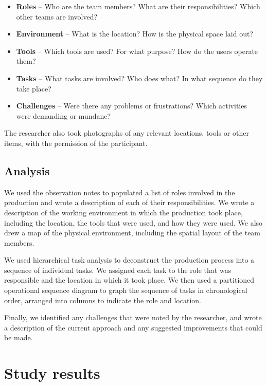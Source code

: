 {\singlespacing
\begin{itemize}
	\item \textbf{Roles} -- Who are the team members? What are their responsibilities? Which other teams are involved?
	\item \textbf{Environment} -- What is the location? How is the physical space laid out?
	\item \textbf{Tools} -- Which tools are used? For what purpose? How do the users operate them?
	\item \textbf{Tasks} -- What tasks are involved? Who does what? In what sequence do they take place?
	\item \textbf{Challenges} -- Were there any problems or frustrations? Which activities were demanding or mundane?
\end{itemize}
}

The researcher also took photographs of any relevant locations, tools or other items, with the permission of the
participant.

\subsection{Analysis}

We used the observation notes to populated a list of roles involved in the production and wrote a description of each
of their responsibilities. We wrote a description of the working environment in which the production took place,
including the location, the tools that were used, and how they were used. We also drew a map of the physical
environment, including the spatial layout of the team members.

We used hierarchical task analysis \citep{Kirwan1992,Annett2000} to deconstruct the production process into a sequence
of individual tasks. We assigned each task to the role that was responsible and the location in which it took
place. We then used a partitioned operational sequence diagram \citep{Kirwan1992} to graph the sequence of tasks in
chronological order, arranged into columns to indicate the role and location.

Finally, we identified any challenges that were noted by the researcher, and wrote a description of the current
approach and any suggested improvements that could be made.

\section{Study results}\label{sec:ethno-results}


